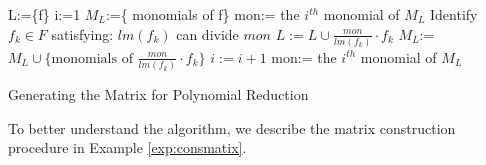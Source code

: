 \begin{algorithm}[hbt]
\SetAlgoNoLine

	L:=\{f\} \;{}
	i:=1\;
	$M_{L}$:=\{ monomials of f\} \;{}
	mon:= the $i^{th}$ monomial of $M_{L}$\;
		{
			Identify $f_{k} \in F$ satisfying: $lm(f_{k})$ can divide $mon$ \;
			$L:=L \cup \frac{mon}{lm(f_{k})}\cdot f_{k}$ \;
			$M_{L}$:=$M_{L} \cup \{ \text{monomials of } \frac{mon}{lm(f_{k})}\cdot f_{k}\}$ \;{}
			$i:=i+1$\;{}
			mon:= the $i^{th}$ monomial of $M_{L}$\;
		}
\caption{Generating the Matrix for Polynomial Reduction}\label{alg:matrix}
\end{algorithm}


To better understand the algorithm, we describe the matrix
construction procedure in Example \ref{exp:consmatix}. 

